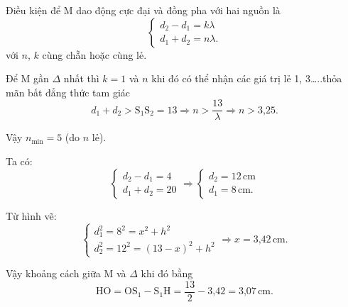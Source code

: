 \begin{enumerate}[label=\bfseries Câu \arabic*:]
{	Điều kiện để M dao động cực đại và đồng pha với hai nguồn là
	$$\begin{cases}
		d_2-d_1=k\lambda\\
		d_1+d_2=n\lambda.
	\end{cases}$$
	với $n$, $k$ cùng chẵn hoặc cùng lẻ.
	
	Để M gần $\Delta$ nhất thì $k = 1$ và $n$ khi đó có thể nhận các giá trị lẻ 1, 3…..thỏa mãn bất đẳng thức tam giác
	$$d_1+d_2>\text{S}_1\text{S}_2=13\Rightarrow n>\dfrac{13}{\lambda}\Rightarrow n>\text{3,25}.$$
	
	Vậy $n_\text{min}=5$ (do $n$ lẻ).
	
	Ta có:
	$$\begin{cases}
		d_2-d_1=4\\
		d_1+d_2=20
	\end{cases}
	\Rightarrow
	\begin{cases}
		d_2=12\,\text{cm}\\
		d_1=8\,\text{cm}.
	\end{cases}$$
	
	Từ hình vẽ:
	$$\begin{cases}
		d_1^2=8^2=x^2+h^2\\
		d_2^2=12^2=(13-x)^2+h^2
	\end{cases}
	\Rightarrow x=\text{3,42}\,\text{cm}.$$
	
	Vậy khoảng cách giữa M và $\Delta$ khi đó bằng
	$$\text{HO}=\text{OS}_1-\text{S}_1\text{H}=\dfrac{13}{2}-\text{3,42}=\text{3,07}\,\text{cm}.$$
}
	
\end{enumerate}
